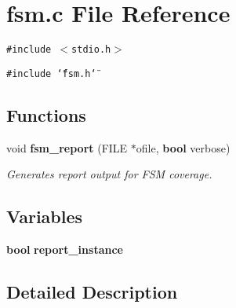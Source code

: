 \section{fsm.c File Reference}
\label{fsm_8c}
{\tt \#include $<$stdio.h$>$}\par
{\tt \#include \char`\"{}fsm.h\char`\"{}}\par
\subsection*{Functions}
\begin{CompactItemize}
\item 
void {\bf fsm\_\-report} (FILE $\ast$ofile, {\bf bool} verbose)
\begin{CompactList}\small\item\em Generates report output for FSM coverage.\item\end{CompactList}\end{CompactItemize}
\subsection*{Variables}
\begin{CompactItemize}
\item 
{\bf bool} {\bf report\_\-instance}
\end{CompactItemize}


\subsection{Detailed Description}


